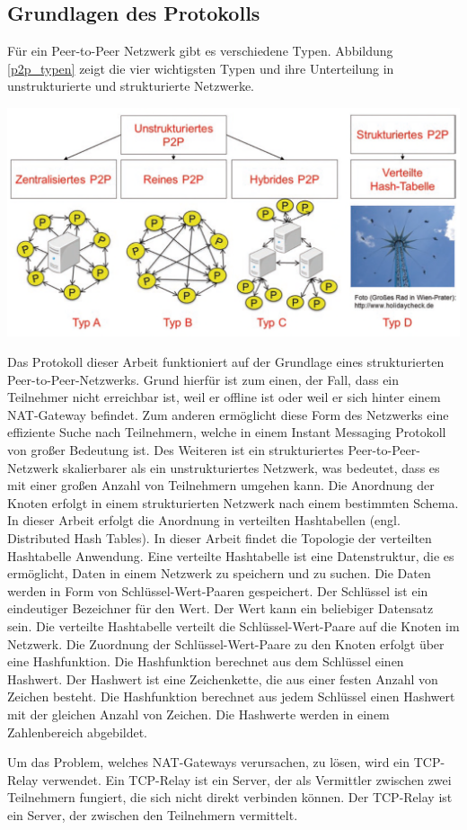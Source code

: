 \subsection{Grundlagen des Protokolls}

Für ein Peer-to-Peer Netzwerk gibt es verschiedene Typen. Abbildung \ref{p2p_typen} zeigt
die vier wichtigsten Typen und ihre Unterteilung in unstrukturierte und strukturierte Netzwerke.

\begin{center}
    \captionsetup{type=figure}
    \includegraphics[width=1\linewidth]{images/peer_to_peer_typen.png}
    \label{p2p_typen}
\end{center}

\noindent Das Protokoll dieser Arbeit funktioniert auf der Grundlage eines strukturierten 
Peer-to-Peer-Netzwerks.
Grund hierfür ist zum einen, der Fall, dass ein Teilnehmer nicht erreichbar ist, weil er offline ist 
oder weil er sich hinter einem NAT-Gateway befindet. Zum anderen ermöglicht diese Form des Netzwerks
eine effiziente Suche nach Teilnehmern, welche in einem Instant Messaging Protokoll von großer 
Bedeutung ist. Des Weiteren ist ein strukturiertes Peer-to-Peer-Netzwerk skalierbarer als ein
unstrukturiertes Netzwerk, was bedeutet, dass es mit einer großen Anzahl von Teilnehmern umgehen kann.
Die Anordnung der Knoten erfolgt in einem strukturierten Netzwerk nach einem bestimmten Schema.
In dieser Arbeit erfolgt die Anordnung in verteilten Hashtabellen (engl. Distributed Hash Tables).
In dieser Arbeit findet die Topologie der verteilten Hashtabelle Anwendung.
Eine verteilte Hashtabelle
ist eine Datenstruktur, die es ermöglicht, Daten in einem Netzwerk zu speichern und zu suchen.
Die Daten werden in Form von Schlüssel-Wert-Paaren gespeichert. Der Schlüssel ist ein eindeutiger
Bezeichner für den Wert. Der Wert kann ein beliebiger Datensatz sein. Die verteilte Hashtabelle
verteilt die Schlüssel-Wert-Paare auf die Knoten im Netzwerk. Die Zuordnung der Schlüssel-Wert-Paare
zu den Knoten erfolgt über eine Hashfunktion. Die Hashfunktion berechnet aus dem Schlüssel einen
Hashwert. Der Hashwert ist eine Zeichenkette, die aus einer festen Anzahl von Zeichen besteht.
Die Hashfunktion berechnet aus jedem Schlüssel einen Hashwert mit der gleichen Anzahl von Zeichen.
Die Hashwerte werden in einem Zahlenbereich abgebildet.

Um das Problem, welches NAT-Gateways verursachen, zu lösen, wird ein TCP-Relay verwendet. 
Ein TCP-Relay ist ein Server, der als Vermittler zwischen zwei Teilnehmern fungiert, die sich nicht 
direkt verbinden können. Der TCP-Relay ist ein Server, der zwischen den Teilnehmern vermittelt.

